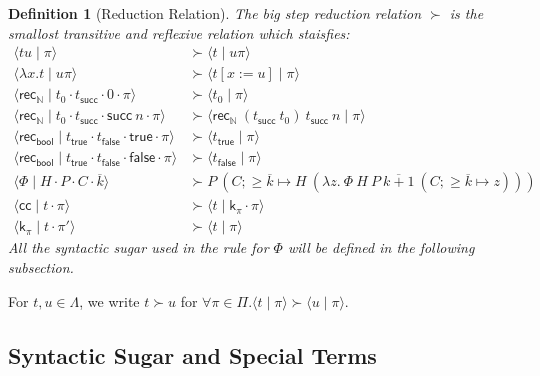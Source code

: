 \documentclass{article}
\newcommand{\successor}{\mathsf{succ}}
\newcommand{\recN}{\mathsf{rec}_{\mathbb{N}}}
\newcommand{\true}{\mathsf{true}}
\newcommand{\false}{\mathsf{false}}
\newcommand{\recbool}{\mathsf{rec_{bool}}}
\newcommand{\proc}[2]{\langle{#1}\mid{#2}\rangle}
\newcommand{\cc}{\mathsf{cc}}
\newcommand{\cont}{\mathsf{k}}
\newtheorem{definition}{Definition}
\begin{document}
\begin{definition}[Reduction Relation]
    The big step reduction relation $\succ$ is the smallost transitive and reflexive relation which staisfies:
    \begin{align*}
        \proc{t u}{\pi} & \succ \proc{t}{u\pi} \\
        \proc{\lambda x. t}{u\pi} & \succ \proc{t[x := u]}{\pi} \\
        \proc{\recN}{t_0 \cdot t_\successor \cdot 0 \cdot \pi} & \succ \proc{t_0}{\pi} \\
        \proc{\recN}{t_0 \cdot t_\successor \cdot \successor\ n \cdot \pi} & \succ \proc{\recN\ (t_\successor\ t_0)\ t_\successor\ n}{\pi} \\
        \proc{\recbool}{t_\true \cdot t_\false \cdot \true \cdot \pi} & \succ \proc{t_\true}{\pi} \\
        \proc{\recbool}{t_\true \cdot t_\false \cdot \false \cdot \pi} & \succ \proc{t_\false}{\pi} \\
        \proc{\Phi}{H \cdot P \cdot C \cdot \overline{k}} & \succ P\ (C; \ge \overline{k} \mapsto H\ (\lambda z.\ \Phi\ H\ P\ \overline{k+1}\ (C; \ge \overline{k} \mapsto z))) \\
        \proc{\cc}{t \cdot \pi} & \succ \proc{t}{\cont_\pi \cdot \pi} \\
        \proc{\cont_\pi}{t \cdot \pi'} & \succ \proc{t}{\pi}
    \end{align*}
    All the syntactic sugar used in the rule for $\Phi$ will be defined in the following subsection.
\end{definition}

For $t, u \in \Lambda$, we write $t \succ u$ for $\forall \pi \in \Pi. \proc{t}{\pi} \succ \proc{u}{\pi}$.

\subsection{Syntactic Sugar and Special Terms}
\end{document}
